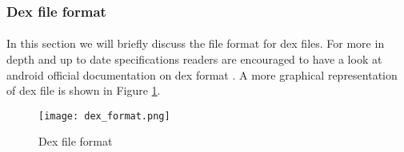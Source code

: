 \documentclass[../main.tex]{subfile}
\begin{document}
			\subsubsection{Dex file format}
			\paragraph{} In this section we will briefly discuss the file format for dex files. For more in depth and up to date specifications readers are encouraged to have a look at android official documentation on dex format \cite{dex_format}. A more graphical representation of dex file is shown in Figure \ref{fig:dex_format}. 
				\begin{figure}
					\texttt{[image: dex\_format.png]}
					\caption{Dex file format \cite{dex_image_albertini}}
					\label{fig:dex_format}
				\end{figure}
				
\end{document}

